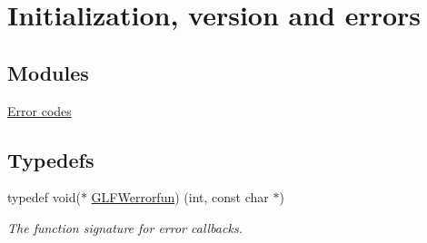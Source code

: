 \hypertarget{group__init}{}\section{Initialization, version and errors}
\label{group__init}
\subsection*{Modules}
\begin{DoxyCompactItemize}
\item 
\hyperlink{group__errors}{Error codes}
\end{DoxyCompactItemize}
\subsection*{Typedefs}
\begin{DoxyCompactItemize}
\item 
typedef void($\ast$ \hyperlink{group__init_ga6b8a2639706d5c409fc1287e8f55e928}{G\+L\+F\+Werrorfun}) (int, const char $\ast$)
\begin{DoxyCompactList}\small\item\em The function signature for error callbacks. \end{DoxyCompactList}\end{DoxyCompactItemize}

